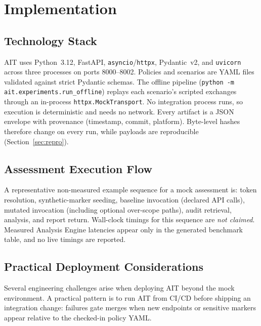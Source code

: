 \documentclass[conference]{IEEEtran}
\begin{document}
\section{Implementation}
\label{sec:impl}

\subsection{Technology Stack}

AIT uses Python~3.12, FastAPI, \texttt{asyncio}/\texttt{httpx},
Pydantic~v2, and \texttt{uvicorn} across three processes on ports
8000--8002. Policies and scenarios are YAML files validated against
strict Pydantic schemas. The offline pipeline
(\texttt{python -m ait.experiments.run\_offline}) replays each scenario's
scripted exchanges through an in-process \texttt{httpx.MockTransport}.
No integration process runs, so execution is deterministic and needs no
network. Every artifact is a JSON envelope with provenance (timestamp,
commit, platform). Byte-level hashes therefore change on every run,
while payloads are reproducible (Section~\ref{sec:repro}).

\subsection{Assessment Execution Flow}

A representative non-measured example sequence for a mock assessment is:
token resolution, synthetic-marker seeding, baseline invocation (declared API
calls), mutated invocation (including optional over-scope paths), audit
retrieval, analysis, and report return. Wall-clock timings for this
sequence are \emph{not claimed}. Measured Analysis Engine latencies
appear only in the generated benchmark table, and no live timings are
reported.

\subsection{Practical Deployment Considerations}
\label{sec:deployment}

Several engineering challenges arise when deploying AIT beyond the
mock environment. A practical pattern is to run AIT from CI/CD before
shipping an integration change: failures gate merges when new endpoints
or sensitive markers appear relative to the checked-in policy YAML.
\end{document}
